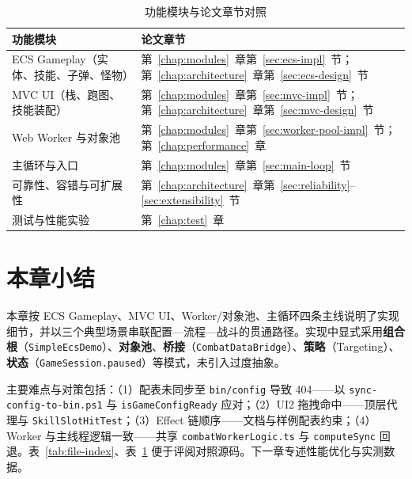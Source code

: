 \begin{table}[htbp]
  \centering
  \caption{功能模块与论文章节对照}
  \label{tab:module-chapter-map}
  \begin{tabular}{p{4.0cm}p{8.5cm}}
    \toprule
    \textbf{功能模块} & \textbf{论文章节} \\
    \midrule
    ECS Gameplay（实体、技能、子弹、怪物） & 第~\ref{chap:modules}~章第~\ref{sec:ecs-impl}~节；第~\ref{chap:architecture}~章第~\ref{sec:ecs-design}~节 \\
    MVC UI（栈、跑图、技能装配） & 第~\ref{chap:modules}~章第~\ref{sec:mvc-impl}~节；第~\ref{chap:architecture}~章第~\ref{sec:mvc-design}~节 \\
    Web Worker 与对象池 & 第~\ref{chap:modules}~章第~\ref{sec:worker-pool-impl}~节；第~\ref{chap:performance}~章 \\
    主循环与入口 & 第~\ref{chap:modules}~章第~\ref{sec:main-loop}~节 \\
    可靠性、容错与可扩展性 & 第~\ref{chap:architecture}~章第~\ref{sec:reliability}--\ref{sec:extensibility}~节 \\
    测试与性能实验 & 第~\ref{chap:test}~章 \\
    \bottomrule
  \end{tabular}
\end{table}

\section{本章小结}

本章按 ECS Gameplay、MVC UI、Worker/对象池、主循环四条主线说明了实现细节，并以三个典型场景串联配置—流程—战斗的贯通路径。实现中显式采用\textbf{组合根}（\texttt{SimpleEcsDemo}）、\textbf{对象池}、\textbf{桥接}（\texttt{CombatDataBridge}）、\textbf{策略}（Targeting）、\textbf{状态}（\texttt{GameSession.paused}）等模式，未引入过度抽象。

主要难点与对策包括：（1）配表未同步至 \texttt{bin/config} 导致 404——以 \texttt{sync-config-to-bin.ps1} 与 \texttt{isGameConfigReady} 应对；（2）UI2 拖拽命中——顶层代理与 \texttt{SkillSlotHitTest}；（3）Effect 链顺序——文档与样例配表约束；（4）Worker 与主线程逻辑一致——共享 \texttt{combatWorkerLogic.ts} 与 \texttt{computeSync} 回退。表~\ref{tab:file-index}、表~\ref{tab:module-chapter-map} 便于评阅对照源码。下一章专述性能优化与实测数据。
